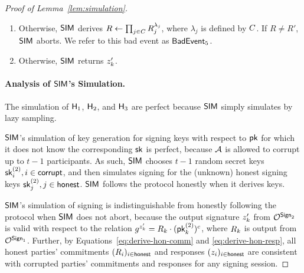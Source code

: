 \begin{proof}[Proof of Lemma~\ref{lem:simulation}]
\begin{itemize}
\begin{enumerate}
      \item Otherwise, $\mathsf{SIM}$ derives $R \gets \prod_{j \in C} R_j^{\lambda_j}$,
        where $\lambda_j$ is defined by $C$.
        If $R \neq R'$,
        $\mathsf{SIM}$ aborts.
        We refer to this bad event as $\mathsf{BadEvent}_5$.

        \item Otherwise, $\mathsf{SIM}$ returns $z_k'$.
      \end{enumerate}
  \end{itemize}

  \paragraph{Analysis of $\mathsf{SIM}$'s Simulation.}
  The simulation of $\mathsf{H}_1$, $\mathsf{H}_2$, and $\mathsf{H}_3$ are perfect because $\mathsf{SIM}$ simply simulates by lazy sampling.

  $\mathsf{SIM}$'s simulation of key generation for signing keys with respect to $\mathsf{pk}$ for which it
  does not know the corresponding $\mathsf{sk}$ is perfect,
  because $\mathcal{A}$ is allowed to corrupt up to $t-1$ participants.
  As such, $\mathsf{SIM}$ chooses $t-1$ random secret keys $\mathsf{sk}^{(2)}_i, i \in \mathsf{corrupt}$,
  and then simulates signing for the (unknown) honest signing keys $\mathsf{sk}^{(2)}_j, j \in \mathsf{honest}$.
  $\mathsf{SIM}$ follows the protocol honestly when it derives \DVRFOne keys.

  $\mathsf{SIM}$'s simulation of signing is indistinguishable from honestly following the protocol when $\mathsf{SIM}$ does not abort,
  because the output signature $z_k'$ from $\mathcal{O}^{\mathsf{Sign}_2}$ is valid with respect to the relation $g^{z_k'} = R_k \cdot (\mathsf{pk}^{(2)}_k)^c$,
  where $R_k$ is output from $\mathcal{O}^{\mathsf{Sign}_1}$.
  Further, by Equations~\ref{eq:derive-hon-comm} and \ref{eq:derive-hon-resp},
  all honest parties' commitments $(R_i)_{i \in \mathsf{honest}}$ and responses $(z_i)_{i \in \mathsf{honest}}$ are consistent with corrupted parties' commitments and responses for any signing session.


\end{proof}
